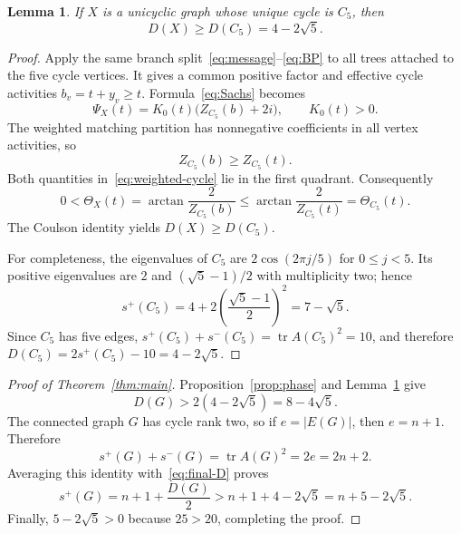 \documentclass[11pt]{article}
\newtheorem{lemma}[theorem]{Lemma}
\theoremstyle{remark}
\newcommand{\tr}{\operatorname{tr}}
\begin{document}
\begin{lemma}\label{lem:lobe}
If $X$ is a unicyclic graph whose unique cycle is $C_5$, then
\begin{equation}\label{eq:lobe-D}
 D(X)\geq D(C_5)=4-2\sqrt5.
\end{equation}
\end{lemma}

\begin{proof}
Apply the same branch split~\eqref{eq:message}--\eqref{eq:BP} to all trees
attached to the five cycle vertices.  It gives a common positive factor and
effective cycle activities $b_v=t+y_v\geq t$.  Formula~\eqref{eq:Sachs}
becomes
\begin{equation}\label{eq:weighted-cycle}
 \Psi_X(t)=K_0(t)\bigl(Z_{C_5}(b)+2i\bigr),
 \qquad K_0(t)>0.
\end{equation}
The weighted matching partition has nonnegative coefficients in all vertex
activities, so
\begin{equation}\label{eq:subpartition}
 Z_{C_5}(b)\geq Z_{C_5}(t).
\end{equation}
Both quantities in~\eqref{eq:weighted-cycle} lie in the first quadrant.
Consequently
\[
 0<\Theta_X(t)=\arctan\frac2{Z_{C_5}(b)}
 \leq\arctan\frac2{Z_{C_5}(t)}=\Theta_{C_5}(t).
\]
The Coulson identity yields $D(X)\geq D(C_5)$.

For completeness, the eigenvalues of $C_5$ are
$2\cos(2\pi j/5)$ for $0\leq j<5$.  Its positive eigenvalues are $2$ and
$(\sqrt5-1)/2$ with multiplicity two; hence
\[
 s^+(C_5)=4+2\left(\frac{\sqrt5-1}{2}\right)^2
          =7-\sqrt5.
\]
Since $C_5$ has five edges,
$s^+(C_5)+s^-(C_5)=\tr A(C_5)^2=10$, and therefore
$D(C_5)=2s^+(C_5)-10=4-2\sqrt5$.
\end{proof}

\begin{proof}[Proof of Theorem~\ref{thm:main}]
Proposition~\ref{prop:phase} and Lemma~\ref{lem:lobe} give
\begin{equation}\label{eq:final-D}
 D(G)>2(4-2\sqrt5)=8-4\sqrt5.
\end{equation}
The connected graph $G$ has cycle rank two, so if $e=|E(G)|$, then
$e=n+1$.  Therefore
\[
 s^+(G)+s^-(G)=\tr A(G)^2=2e=2n+2.
\]
Averaging this identity with~\eqref{eq:final-D} proves
\[
 s^+(G)=n+1+\frac{D(G)}2
 >n+1+4-2\sqrt5=n+5-2\sqrt5.
\]
Finally, $5-2\sqrt5>0$ because $25>20$, completing the proof.
\end{proof}
\end{document}

